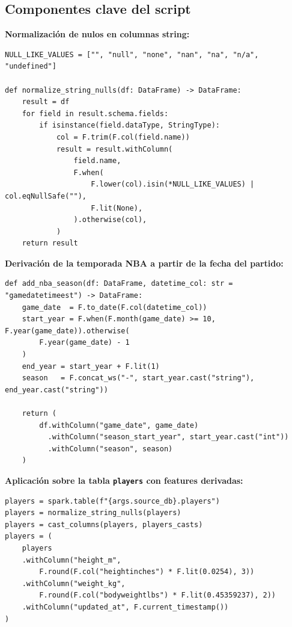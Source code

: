 \documentclass[12pt, letterpaper]{article}
\begin{document}
\subsection{Componentes clave del script}

\textbf{Normalización de nulos en columnas string:}

\begin{lstlisting}[style=codestyle, caption={Función \texttt{normalize\_string\_nulls} --- convierte variantes de null a NULL real}]
NULL_LIKE_VALUES = ["", "null", "none", "nan", "na", "n/a", "undefined"]

def normalize_string_nulls(df: DataFrame) -> DataFrame:
    result = df
    for field in result.schema.fields:
        if isinstance(field.dataType, StringType):
            col = F.trim(F.col(field.name))
            result = result.withColumn(
                field.name,
                F.when(
                    F.lower(col).isin(*NULL_LIKE_VALUES) | col.eqNullSafe(""),
                    F.lit(None),
                ).otherwise(col),
            )
    return result
\end{lstlisting}

\textbf{Derivación de la temporada NBA a partir de la fecha del partido:}

\begin{lstlisting}[style=codestyle, caption={Función \texttt{add\_nba\_season} --- temporada derivada de \texttt{gamedatetimeest}}]
def add_nba_season(df: DataFrame, datetime_col: str = "gamedatetimeest") -> DataFrame:
    game_date  = F.to_date(F.col(datetime_col))
    start_year = F.when(F.month(game_date) >= 10, F.year(game_date)).otherwise(
        F.year(game_date) - 1
    )
    end_year = start_year + F.lit(1)
    season   = F.concat_ws("-", start_year.cast("string"), end_year.cast("string"))

    return (
        df.withColumn("game_date", game_date)
          .withColumn("season_start_year", start_year.cast("int"))
          .withColumn("season", season)
    )
\end{lstlisting}

\textbf{Aplicación sobre la tabla \texttt{players} con features derivadas:}

\begin{lstlisting}[style=codestyle, caption={Transformaciones sobre la tabla \texttt{players}: tipos, conversiones métricas y timestamp}]
players = spark.table(f"{args.source_db}.players")
players = normalize_string_nulls(players)
players = cast_columns(players, players_casts)
players = (
    players
    .withColumn("height_m",
        F.round(F.col("heightinches") * F.lit(0.0254), 3))
    .withColumn("weight_kg",
        F.round(F.col("bodyweightlbs") * F.lit(0.45359237), 2))
    .withColumn("updated_at", F.current_timestamp())
)
\end{lstlisting}
\end{document}
